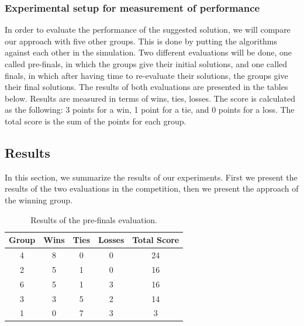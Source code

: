 \documentclass[a4paper,12pt]{article}
\begin{document}
\subsubsection{Experimental setup for measurement of performance}
In order to evaluate the performance of the suggested solution, we will compare our approach with five other groups. 
This is done by putting the algorithms against each other in the simulation. 
Two different evaluations will be done, one called pre-finals, in which the groups give their initial solutions, and one called finals, in which after having time to re-evaluate their solutions, the groups give their final solutions.
The results of both evaluations are presented in the tables below.
Results are measured in terms of wins, ties, losses. The score is calculated as the following: 3 points for a win, 1 point for a tie, and 0 points for a loss. The total score is the sum of the points for each group.




\subsection{Results}
\label{subsec:results}
In this section, we summarize the results of our experiments. First we present the results of the two evaluations in the competition, then we present the approach of the winning group.


\begin{table}[!hptb]
  \centering
  \begin{tabular}{|c|c|c|c|c|}
    \hline
    \textbf{Group} & \textbf{Wins} & \textbf{Ties} & \textbf{Losses} & \textbf{Total Score} \\
    \hline
    4 & 8 & 0 & 0 & 24 \\
    \hline
    2 & 5 & 1 & 0 & 16 \\
    \hline
    6 & 5 & 1 & 3 & 16 \\
    \hline
    3 & 3 & 5 & 2 & 14 \\
    \hline
    1 & 0 & 7 & 3 & 3 \\
    \hline
  \end{tabular}
  \caption{Results of the pre-finals evaluation.}
  \label{tab:results_prefinals}
\end{table}
\end{document}
